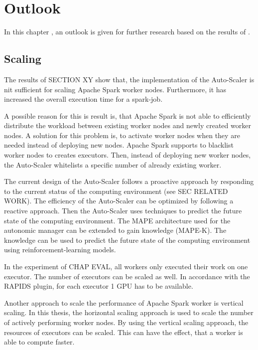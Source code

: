 \chapter{Outlook}
\label{chap:08_outlook}

In this chapter , an outlook is given for further research based on the results of .


\section{Scaling}
The results of SECTION XY show that, the implementation of the Auto-Scaler is nit sufficient for scaling Apache Spark worker nodes. Furthermore, it has increased the overall execution time for a spark-job.


A possible reason for this is result is, that Apache Spark is not able to efficiently distribute the workload between existing worker nodes and newly created worker nodes.
A solution for this problem is, to activate worker nodes when they are needed instead of deploying new nodes. Apache Spark supports to blacklist worker nodes to creates executors.
Then, instead of deploying new worker nodes, the Auto-Scaler whitelists a specific number of already existing worker.


The current design of the Auto-Scaler follows a proactive approach by responding to the current status of the computing environment (see SEC RELATED WORK).
The efficiency of the Auto-Scaler can be optimized by following a reactive approach. Then the Auto-Scaler uses techniques to predict the future state of the computing environment.
The MAPE architecture used for the autonomic manager can be extended to gain knowledge (MAPE-K).
The knowledge can be used to predict the future state of the computing environment using reinforcement-learning models.


In the experiment of CHAP EVAL, all workers only executed their work on one executor.
The number of executors can be scaled as well.
In accordance with the RAPIDS plugin, for each executor 1 GPU has to be available.



Another approach to scale the performance of Apache Spark worker is vertical scaling.
In this thesis, the horizontal scaling approach is used to scale the number of actively performing worker nodes.
%
By using the vertical scaling approach, the resources of executors can be scaled. This can have the effect, that a worker is able to compute faster.


